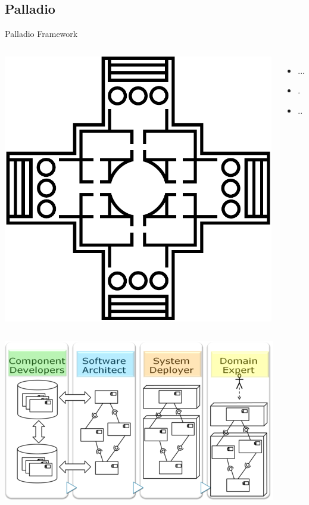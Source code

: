 \documentclass{sdqbeamer}
\begin{document}
\subsection{Palladio}
\begin{frame}{Palladio Framework}
\begin{columns}
\includegraphics[width=\textwidth]{palladio.pdf}
\begin{itemize}
\item ...
\item .
\item ..
\end{itemize}
\end{columns}
\end{frame}
\begin{frame}
\centering
\includegraphics[width=.8\textwidth]{palladio_sichten.png}
\end{frame}
\end{document}

